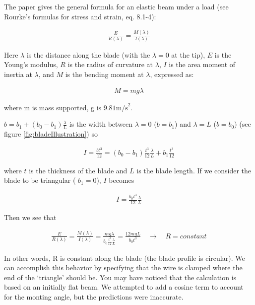 The paper gives the general formula for an elastic beam under a load (see Rourke's formulas for stress and strain, eq. 8.1-4):

\begin{eqnarray}
\frac{E}{R(\lambda)} = \frac{M(\lambda)}{I(\lambda)}
\label{eq:R}
\end{eqnarray}
 
Here $\lambda$ is the distance along the blade (with the $\lambda=0$ at the tip), $E$ is the Young's modulus, $R$ is the radius of curvature at $\lambda$, $I$ is the area moment of inertia at $\lambda$, and $M$ is the bending moment at $\lambda$, expressed as: 

\begin{eqnarray}
M = m g \lambda
\label{eq:M}
\end{eqnarray}

where m is mass supported, g is $9.81 \mbox{m/s}^2$.

$b = b_1+(b_0-b_1) \frac{\lambda}{L}$ is the width between $\lambda=0$ ($b=b_1$) and $\lambda=L$ ($b=b_0$) (see figure \ref{fig:bladeIllustration}) so

\begin{eqnarray}
I = \frac{b t^3}{12} = (b_0-b_1)\frac{t^3}{12} \frac{\lambda}{L}+b_1\frac{t^3}{12}
\label{eq:I1}
\end{eqnarray}


where $t$ is the thickness of the blade and $L$ is the blade length.  If we consider the blade to be triangular ( $b_1=0$), $I$ becomes

\begin{eqnarray}
I = \frac{b_0t^3}{12} \frac{\lambda}{L}
\label{eq:Itri}
\end{eqnarray}

Then we see that 

\begin{eqnarray}
\frac{E}{R(\lambda)} = \frac{M(\lambda)}{I(\lambda)} = 
\frac{m g \lambda}{b_0\frac{t^3}{12} \frac{\lambda}{L}} = 
\frac{12 m g L}{b_0 t^3} \quad \rightarrow \quad R=constant
\label{eq:E/R}
\end{eqnarray}

In other words, R is constant along the blade (the blade profile is circular). We can accomplish this behavior by specifying that the wire is clamped where the end of the `triangle' should be.
You may have noticed that the calculation is based on an initially flat beam. We attempted to add a cosine term to account for the monting angle, but the predictions were inaccurate.

